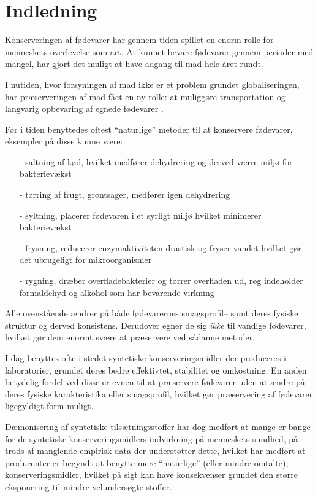 \section{Indledning}
    Konserveringen af fødevarer har gennem tiden spillet en enorm rolle for menneskets overlevelse som art. At kunnet bevare fødevarer gennem perioder med mangel, har gjort det muligt at have adgang til mad hele året rundt. 

    I nutiden, hvor forsyningen af mad ikke er et problem grundet globaliseringen, har præserveringen af mad fået en ny rolle: at muliggøre transportation og langvarig opbevaring af egnede fødevarer \parencite{Elis2019}.

    Før i tiden benyttedes oftest ``naturlige'' metoder til at konservere fødevarer, eksempler på disse kunne være: 
    \begin{itemize}
        \item[-] saltning af kød, hvilket medfører dehydrering og derved værre miljø for bakterievækst
        \item[-] tørring af frugt, grøntsager, medfører igen dehydrering
        \item[-] syltning, placerer fødevaren i et syrligt miljø hvilket minimerer bakterievækst
        \item[-] frysning, reducerer enzymaktiviteten drastisk og fryser vandet hvilket gør det ubrugeligt for mikroorganismer
        \item[-] rygning, dræber overfladebakterier og tørrer overfladen ud, røg indeholder formaldehyd og alkohol som har bevarende virkning
    \end{itemize}
    Alle ovenstående ændrer på både fødevarernes smagsprofil-- samt deres fysiske struktur og derved konsistens. Derudover egner de sig \textit{ikke} til vandige fødevarer, hvilket gør dem enormt svære at præservere ved sådanne metoder. 

    I dag benyttes ofte i stedet syntetiske konserveringsmidler der produceres i laboratorier, grundet deres bedre effektivtet, stabilitet og omkostning. En anden betydelig fordel ved disse er evnen til at præservere fødevarer uden at ændre på deres fysiske karakteristika eller smagsprofil, hvilket gør præservering af fødevarer ligegyldigt form muligt.

    Dæmonisering af syntetiske tilsætningsstoffer har dog medført at mange er bange for de syntetiske konserveringsmidlers indvirkning på menneskets sundhed, på trods af manglende empirisk data der understøtter dette, hvilket har medført at producenter er begyndt at benytte mere ``naturlige'' (eller mindre omtalte), konserveringsmidler, hvilket på sigt kan have konsekvenser grundet den større eksponering til mindre velundersøgte stoffer.


